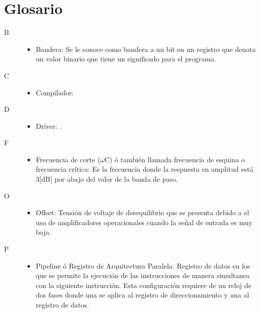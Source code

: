 \documentclass[letterpaper,12pt,oneside]{book}
\begin{document}
	\chapter{Glosario}
	\begin{description}
		\item[\LARGE B]
		\hfill
		\begin{itemize}
			\item Bandera: Se le conoce como bandera a un bit en un registro que denota un valor binario que tiene un significado para el programa.
		\end{itemize}

		\item[\LARGE C]
		\hfill
		\begin{itemize}
			\item Compilador: 
		\end{itemize}

		\item[\LARGE D]
		\hfill
		\begin{itemize}
			\item Driver: .
		\end{itemize}

		\item[\LARGE F]
		\hfill
		\begin{itemize}
			\item Frecuencia de corte ($\omega$C) ó también llamada frecuencia de esquina o frecuencia crítica: Es la frecuencia donde la respuesta en amplitud está 3[dB] por abajo del valor de la banda de paso.
		\end{itemize}

		\item[\LARGE O]
		\hfill
		\begin{itemize}
			\item Offset: Tensión de voltaje de desequilibrio que se presenta debido a el uso de amplificadores operacionales cuando la señal de entrada es muy baja.\cite{areny2005sensores}
		\end{itemize}

		\item[\LARGE P]
		\hfill
		\begin{itemize}
			\item Pipeline ó Registro de Arquitectura Paralela: Registro de datos en los que se permite la ejecución de las instrucciones de manera simultanea con la siguiente instrucción. Esta configuración requiere de un reloj de dos fases donde una se aplica al registro de direccionamiento y una al registro de datos.\cite{mano1994arquitectura}
		\end{itemize}


\end{description}
\end{document}

